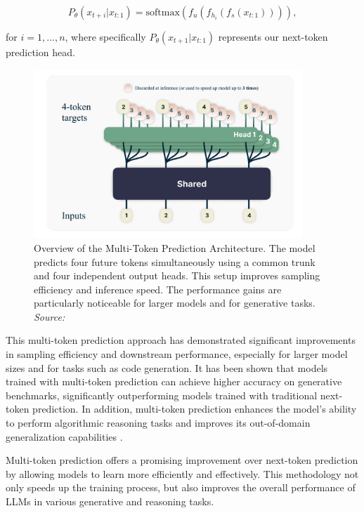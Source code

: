 \begin{equation}
    P_\theta(x_{t+i} | x_{t:1}) = \text{softmax}(f_u(f_{h_i}(f_s(x_{t:1})))),
\end{equation}

for \( i = 1, \ldots, n \), where specifically \( P_\theta(x_{t+1} | x_{t:1}) \) represents our next-token prediction head.

\begin{figure}[h]
    \centering
    \includegraphics[width=0.9\textwidth]{images/llms/multi-token-pred-architecture.png}
    \caption{Overview of the Multi-Token Prediction Architecture. The model predicts four future tokens simultaneously using a common trunk and four independent output heads. This setup improves sampling efficiency and inference speed. The performance gains are particularly noticeable for larger models and for generative tasks. \textit{Source:} \cite{gloeckle2024better}}
    \label{fig:multi-token-prediction}
\end{figure}

This multi-token prediction approach has demonstrated significant improvements in sampling efficiency and downstream performance, especially for larger model sizes and for tasks such as code generation. It has been shown that models trained with multi-token prediction can achieve higher accuracy on generative benchmarks, significantly outperforming models trained with traditional next-token prediction. In addition, multi-token prediction enhances the model's ability to perform algorithmic reasoning tasks and improves its out-of-domain generalization capabilities \cite{gloeckle2024better}.

Multi-token prediction offers a promising improvement over next-token prediction by allowing models to learn more efficiently and effectively. This methodology not only speeds up the training process, but also improves the overall performance of LLMs in various generative and reasoning tasks.


